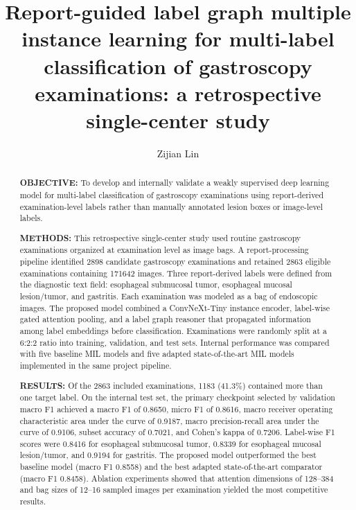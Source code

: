 \documentclass[Afour,sagev,times]{sagej}
\begin{document}

\title{Report-guided label graph multiple instance learning for multi-label classification of gastroscopy examinations: a retrospective single-center study}

\author{Zijian Lin}




\begin{abstract}
\textbf{OBJECTIVE:} To develop and internally validate a weakly supervised deep learning model for multi-label classification of gastroscopy examinations using report-derived examination-level labels rather than manually annotated lesion boxes or image-level labels.

\textbf{METHODS:} This retrospective single-center study used routine gastroscopy examinations organized at examination level as image bags. A report-processing pipeline identified 2898 candidate gastroscopy examinations and retained 2863 eligible examinations containing 171642 images. Three report-derived labels were defined from the diagnostic text field: esophageal submucosal tumor, esophageal mucosal lesion/tumor, and gastritis. Each examination was modeled as a bag of endoscopic images. The proposed model combined a ConvNeXt-Tiny instance encoder, label-wise gated attention pooling, and a label graph reasoner that propagated information among label embeddings before classification. Examinations were randomly split at a 6:2:2 ratio into training, validation, and test sets. Internal performance was compared with five baseline MIL models and five adapted state-of-the-art MIL models implemented in the same project pipeline.

\textbf{RESULTS:} Of the 2863 included examinations, 1183 (41.3\%) contained more than one target label. On the internal test set, the primary checkpoint selected by validation macro F1 achieved a macro F1 of 0.8650, micro F1 of 0.8616, macro receiver operating characteristic area under the curve of 0.9187, macro precision-recall area under the curve of 0.9106, subset accuracy of 0.7021, and Cohen's kappa of 0.7206. Label-wise F1 scores were 0.8416 for esophageal submucosal tumor, 0.8339 for esophageal mucosal lesion/tumor, and 0.9194 for gastritis. The proposed model outperformed the best baseline model (macro F1 0.8558) and the best adapted state-of-the-art comparator (macro F1 0.8458). Ablation experiments showed that attention dimensions of 128--384 and bag sizes of 12--16 sampled images per examination yielded the most competitive results.


\end{abstract}
\end{document}
